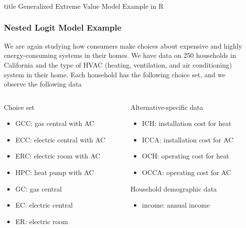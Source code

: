 \documentclass{beamer}
\begin{document}
\begin{frame}\frametitle{}
    \vfill
    \centering
    \begin{beamercolorbox}[center]{title}
        \Large Generalized Extreme Value Model Example in R
    \end{beamercolorbox}
    \vfill
\end{frame}

\begin{frame}\frametitle{Nested Logit Model Example}
    We are again studying how consumers make choices about expensive and highly energy-consuming systems in their homes. We have data on 250 households in California and the type of HVAC (heating, ventilation, and air conditioning) system in their home. Each household has the following choice set, and we observe the following data \\
    \vspace{3ex}
    \begin{columns}
    	\begin{column}{0.5\textwidth}
		    Choice set
		    \begin{itemize}
		    	\item GCC: gas central with AC
		    	\item ECC: electric central with AC
		    	\item ERC: electric room with AC
		    	\item HPC: heat pump with AC
		    	\item GC: gas central
		    	\item EC: electric central
		    	\item ER: electric room
		    \end{itemize}
		    \vspace{2ex}
	    \end{column}
	    \begin{column}{0.5\textwidth}
		    Alternative-specific data
		    \begin{itemize}
		    	\item ICH: installation cost for heat
		    	\item ICCA: installation cost for AC
		    	\item OCH: operating cost for heat
		    	\item OCCA: operating cost for AC
		    \end{itemize}
		    \vspace{2ex}
		    Household demographic data
		    \begin{itemize}
		    	\item income: annual income
		    \end{itemize}
		\end{column}
    \end{columns}
\end{frame}
\end{document}
